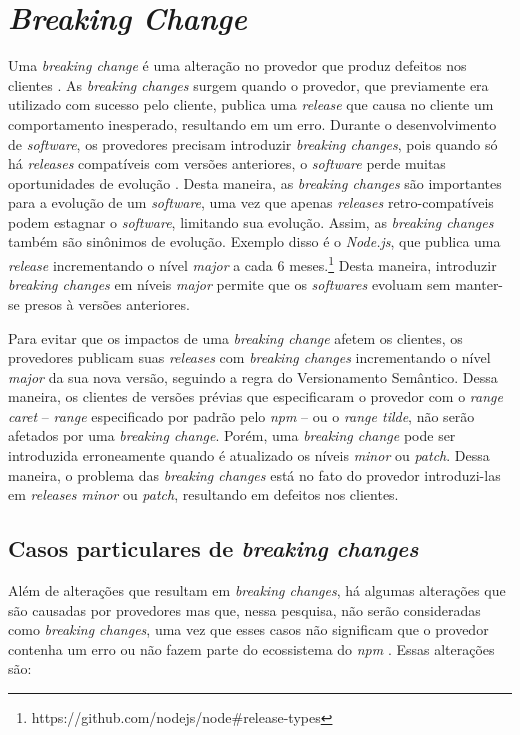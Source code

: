 \section{\textit{Breaking Change}}
\label{ref-teo:breaking_change}
Uma \textit{breaking change} é uma alteração no provedor que produz defeitos nos clientes \cite{teorical_reference:semver}. As \textit{breaking changes} surgem quando o provedor, que previamente era utilizado com sucesso pelo cliente, publica uma \textit{release} que causa no cliente um comportamento inesperado, resultando em um erro. Durante o desenvolvimento de \textit{software}, os provedores precisam introduzir \textit{breaking changes}, pois quando só há \textit{releases} compatíveis com versões anteriores, o \textit{software} perde muitas oportunidades de evolução \cite{teorical_reference:bc_2}. Desta maneira, as \textit{breaking changes} são importantes para a evolução de um \textit{software}, uma vez que apenas \textit{releases} retro-compatíveis podem estagnar o \textit{software}, limitando sua evolução. Assim, as \textit{breaking changes} também são sinônimos de evolução. Exemplo disso é o \textit{Node.js}, que publica uma \textit{release} incrementando o nível \textit{major} a cada 6 meses.\footnote{https://github.com/nodejs/node\#release-types} Desta maneira, introduzir \textit{breaking changes} em níveis \textit{major} permite que os \textit{softwares} evoluam sem manter-se presos à versões anteriores.

Para evitar que os impactos de uma \textit{breaking change} afetem os clientes, os provedores publicam suas \textit{releases} com \textit{breaking changes} incrementando o nível \textit{major} da sua nova versão, seguindo a regra do Versionamento Semântico. Dessa maneira, os clientes de versões prévias que especificaram o provedor com o \textit{range caret} -- \textit{range} especificado por padrão pelo \textit{npm} -- ou o \textit{range tilde}, não serão afetados por uma \textit{breaking change}. Porém, uma \textit{breaking change} pode ser introduzida erroneamente quando é atualizado os níveis \textit{minor} ou \textit{patch}. Dessa maneira, o problema das \textit{breaking changes} está no fato do provedor introduzi-las em \textit{releases minor} ou \textit{patch}, resultando em defeitos nos clientes.

\subsection{Casos particulares de \textit{breaking changes}}
Além de alterações que resultam em \textit{breaking changes}, há algumas alterações que são causadas por provedores mas que, nessa pesquisa, não serão consideradas como \textit{breaking changes}, uma vez que esses casos não significam que o provedor contenha um erro ou não fazem parte do ecossistema do \textit{npm} . Essas alterações são:

